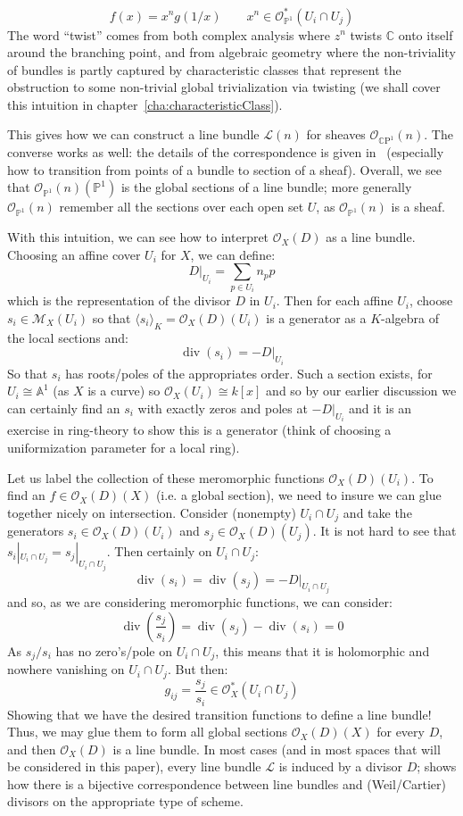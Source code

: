\documentclass{book}
\newcommand{\A}{{\mathbb{A}}}
\newcommand{\C}{{\mathbb{C}}}
\renewcommand{\P}{{\mathbb{P}}}
\newcommand{\CL}{{\mathcal{L}}}
\newcommand{\CM}{{\mathcal{M}}}
\newcommand{\CO}{{\mathcal{O}}}
\newcommand{\CP}{\mathbb{C}\mathrm{P}}
\renewcommand{\div}{{\operatorname{div}}}
\begin{document}
\[
  f(x) = x^ng(1/x) \qquad x^n \in \CO_{\P^1}^*(U_i\cap U_j)
\]
The word ``twist'' comes from both complex analysis where $z^n$ twists $\C$ onto itself around the branching
point, and from algebraic geometry where the non-triviality of bundles is partly captured by characteristic
classes that represent the obstruction to some non-trivial global trivialization via twisting (we shall cover
this intuition in chapter~\ref{cha:characteristicClass}).

This gives how we can construct a line bundle $\CL(n)$ for sheaves $\CO_{\CP^1}(n)$. The converse works as
well: the details of the correspondence is given in~\cite[section~4.1]{NateAlgGeo} (especially how to
transition from points of a bundle to section of a sheaf). Overall, we see that $\CO_{\P^1}(n)(\P^1)$ is the
global sections of a line bundle; more generally $\CO_{\P^1}(n)$ remember all the sections over each open set
$U$, as $\CO_{\P^1}(n)$ is a sheaf.

With this intuition, we can see how to interpret $\CO_X(D)$ as a line bundle. Choosing an affine cover $U_i$
for $X$, we can define:
\[
  D|_{U_i} = \sum_{p \in U_i} n_pp
\]
which is the representation of the divisor $D$ in $U_i$. Then for each affine $U_i$, choose $s_i \in \CM_X(U_i)$
so that $\langle s_i \rangle_K = \CO_X(D)(U_i)$ is a generator as a $K$-algebra of the local sections and:
\[
  \div(s_i) = -D|_{U_i}
\]
So that $s_i$ has roots/poles of the appropriates order. Such a section exists, for $U_i \cong \A^1$ (as $X$
is a curve) so $\CO_X(U_i) \cong k[x]$ and so by our earlier discussion we can certainly find an $s_i$ with
exactly zeros and poles at $-D|_{U_i}$ and it is an exercise in ring-theory to show this is a generator (think
of choosing a uniformization parameter for a local ring).

Let us label the collection of these meromorphic functions $\CO_X(D)(U_i)$. To find an $f \in \CO_X(D)(X)$ (i.e.
a global section), we need to insure we can glue together nicely on intersection. Consider (nonempty)
$U_i\cap U_j$ and take the generators $s_i \in \CO_X(D)(U_i)$ and $s_j \in \CO_X(D)(U_j)$. It is not hard to
see that $s_i|_{U_i\cap U_j} =
s_j|_{U_i\cap U_j}$. Then certainly on $U_i\cap U_j$:
\[
  \div(s_i) = \div(s_j) = -D|_{U_i\cap U_j}
\]
and so, as we are considering meromorphic functions, we can consider:
\[
  \div \left(\frac{s_j}{s_i}\right) = \div(s_j) - \div(s_i) = 0
\]
As $s_j/s_i$ has no zero's/pole on $U_i\cap U_j$, this means that it is holomorphic and nowhere vanishing on
$U_i\cap U_j$. But then:
\[
  g_{ij} = \frac{s_j}{s_i} \in \CO_X^*(U_i\cap U_j)
\]
Showing that we have the desired transition functions to define a line bundle! Thus, we may glue them to form
all global sections $\CO_{X}(D)(X)$ for every $D$, and then $\CO_X(D)$ is a line bundle. In most cases (and in
most spaces that will be considered in this paper), every line bundle $\CL$ is induced by a divisor $D$;
\cite[section~4.3]{NateAlgGeo} shows how there is a bijective correspondence between line bundles and
(Weil/Cartier) divisors on the appropriate type of scheme.
\end{document}
